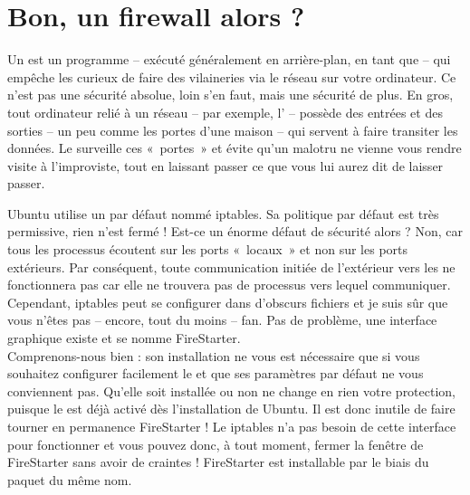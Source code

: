 \section{Bon, un firewall alors ?}
Un  est un programme -- exécuté généralement en arrière-plan, en tant que  -- qui empêche les curieux de faire des vilaineries via le réseau sur votre ordinateur. Ce n'est pas une sécurité absolue, loin s'en faut, mais une sécurité de plus. En gros, tout ordinateur relié à un réseau -- par exemple, l' -- possède des entrées et des sorties -- un peu comme les portes d'une maison -- qui servent à faire transiter les données. Le  surveille ces «~portes~» et évite qu'un malotru ne vienne vous rendre visite à l'improviste, tout en laissant passer ce que vous lui aurez dit de laisser passer.\par
Ubuntu utilise un  par défaut nommé iptables. Sa politique par défaut est très permissive, rien n'est fermé ! Est-ce un énorme défaut de sécurité alors ? Non, car tous les processus écoutent sur les ports «~locaux~» et non sur les ports extérieurs. Par conséquent, toute communication initiée de l'extérieur vers les  ne fonctionnera pas car elle ne trouvera pas de processus vers lequel communiquer. Cependant, iptables peut se configurer dans d'obscurs fichiers  et je suis sûr que vous n'êtes pas -- encore, tout du moins -- fan. Pas de problème, une interface graphique existe et se nomme FireStarter.\\
Comprenons-nous bien : son installation ne vous est nécessaire que si vous souhaitez configurer facilement le  et que ses paramètres par défaut ne vous conviennent pas. Qu'elle soit installée ou non ne change en rien votre protection, puisque le  est déjà activé dès l'installation de Ubuntu. Il est donc inutile de faire tourner en permanence FireStarter ! Le  iptables n'a pas besoin de cette interface pour fonctionner et vous pouvez donc, à tout moment, fermer la fenêtre de FireStarter sans avoir de craintes ! FireStarter est installable par le biais du paquet du même nom.


